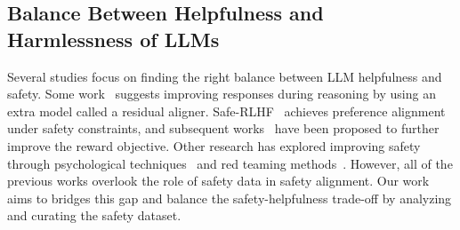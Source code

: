 \subsection{Balance Between Helpfulness and Harmlessness of LLMs} 
Several studies focus on finding the right balance between LLM helpfulness and safety. Some work~\cite{ji2024alignerefficientalignmentlearning} suggests improving responses during reasoning by using an extra model called a residual aligner. Safe-RLHF~\cite{dai2023saferlhfsafereinforcement} achieves preference alignment under safety constraints, and subsequent works~\cite{zhang2024bifactorialpreferenceoptimizationbalancing} have been proposed to further improve the reward objective. Other research has explored improving safety through psychological techniques~\cite{heston2023safety, wu2024llm} and red teaming methods~\cite{ge2023mart, perez2022red, ganguli2022red}. However, all of the previous works overlook the role of safety data in safety alignment. Our work aims to bridges this gap and balance the safety-helpfulness trade-off by analyzing and curating the safety dataset.